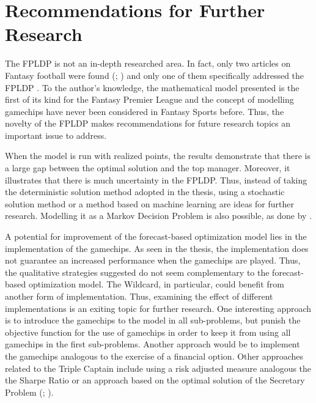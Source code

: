 
\chapter{Recommendations for Further Research}

The FPLDP is not an in-depth researched area. In fact, only two articles on Fantasy football were found (\cite{Matthews}; \cite{Bonomo}) and only one of them specifically addressed the FPLDP \citep{Matthews}. To the author's knowledge, the mathematical model presented is the first of its kind for the Fantasy Premier League and the concept of modelling gamechips have never been considered in Fantasy Sports before. Thus, the novelty of the FPLDP makes recommendations for future research topics an important issue to address.

\newpar

When the model is run with realized points, the results demonstrate that there is a large gap between the optimal solution and the top manager. Moreover, it illustrates that there is much uncertainty in the FPLDP. Thus, instead of taking the deterministic solution method adopted in the thesis, using a stochastic solution method or a method based on machine learning are ideas for further research. Modelling it as a Markov Decision Problem is also possible, as done by \cite{Matthews}.

\newpar

A potential for improvement of the forecast-based optimization model lies in the implementation of the gamechips. As seen in the thesis, the implementation does not guarantee an increased performance when the gamechips are played. Thus, the qualitative strategies suggested do not seem complementary to the forecast-based optimization model. The Wildcard, in particular, could benefit from another form of implementation. Thus, examining the effect of different implementations is an exiting topic for further research. One interesting approach is to introduce the gamechips to the model in all sub-problems, but punish the objective function for the use of gamechips in order to keep it from using all gamechips in the first sub-problems. Another approach would be to implement the gamechips analogous to the exercise of a financial option. Other approaches related to the Triple Captain include using a risk adjusted measure analogous the the Sharpe Ratio \citep{Sharpe} or an approach based on the optimal solution of the Secretary Problem (\cite{Lindley}; \cite{Bruss}). 


